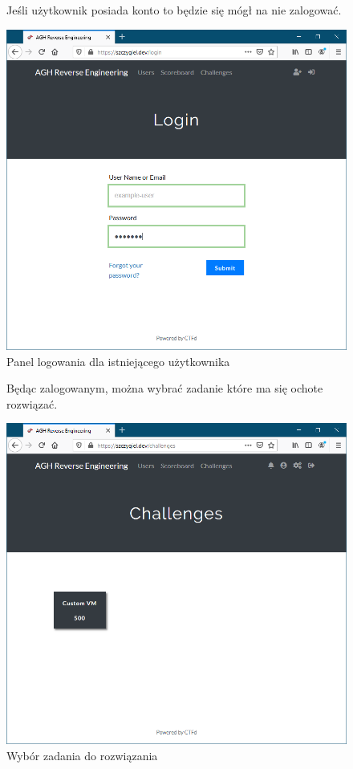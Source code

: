 \documentclass[polish,12pt]{aghthesis}
\begin{document}
\begin{figure}[ht]
    Jeśli użytkownik posiada konto to będzie się mógł na nie zalogować.

    \vspace{1cm}

    \centering
    \includegraphics[width=14cm]{szczygiel_dev_login}
    \caption{Panel logowania dla istniejącego użytkownika}
    \label{fig:szczygiel_dev_login}
\end{figure}

\begin{figure}[ht]
    Będąc zalogowanym, można wybrać zadanie które ma się ochote rozwiązać.

    \vspace{1cm}

    \centering
    \includegraphics[width=14cm]{szczygiel_dev_challenges}
    \caption{Wybór zadania do rozwiązania}
    \label{fig:szczygiel_dev_challenges}
\end{figure}
\end{document}
